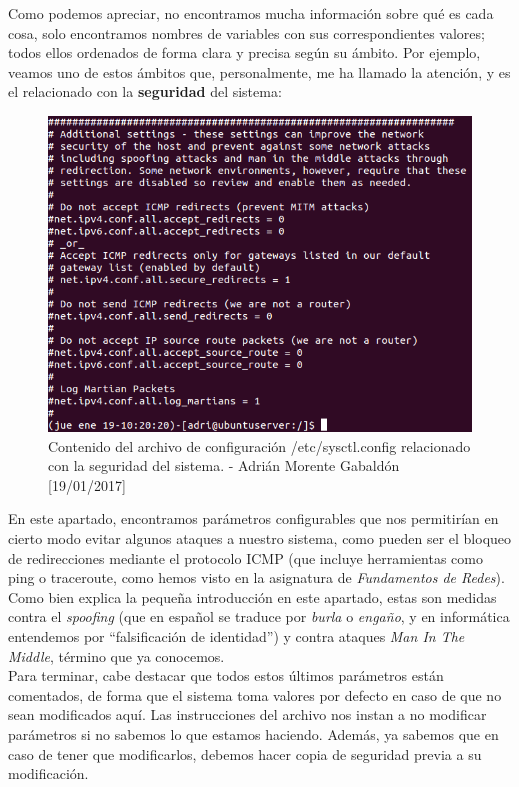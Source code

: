 Como podemos apreciar, no encontramos mucha información sobre qué es cada cosa, solo encontramos nombres de variables con sus correspondientes valores; todos ellos ordenados de forma clara y precisa según su ámbito. Por ejemplo, veamos uno de estos ámbitos que, personalmente, me ha llamado la atención, y es el relacionado con la \textbf{seguridad} del sistema:
\begin{figure}[H]
	\centering
	\includegraphics[scale=0.45]{sysctl-security}
	\caption{Contenido del archivo de configuración /etc/sysctl.config relacionado con la seguridad del sistema. - Adrián Morente Gabaldón [19/01/2017]}
	\label{figura6}
\end{figure}
En este apartado, encontramos parámetros configurables que nos permitirían en cierto modo evitar algunos ataques a nuestro sistema, como pueden ser el bloqueo de redirecciones mediante el protocolo ICMP (que incluye herramientas como ping o traceroute, como hemos visto en la asignatura de \emph{Fundamentos de Redes}). Como bien explica la pequeña introducción en este apartado, estas son medidas contra el \emph{spoofing} (que en español se traduce por \emph{burla} o \emph{engaño}, y en informática entendemos por ``falsificación de identidad'') y contra ataques \emph{Man In The Middle}, término que ya conocemos.\\
Para terminar, cabe destacar que todos estos últimos parámetros están comentados, de forma que el sistema toma valores por defecto en caso de que no sean modificados aquí. Las instrucciones del archivo nos instan a no modificar parámetros si no sabemos lo que estamos haciendo. Además, ya sabemos que en caso de tener que modificarlos, debemos hacer copia de seguridad previa a su modificación.


